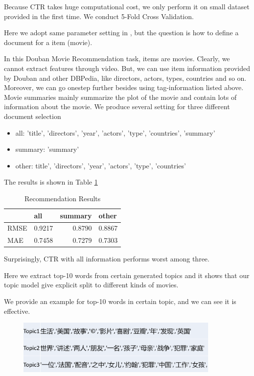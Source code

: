 \documentclass[11pt,a4paper]{article}
\begin{document}
Because CTR takes huge computational cost, we only perform it on small dataset provided in the first time. We conduct 5-Fold Cross Validation.

Here we adopt same parameter setting in \citep{wang2011collaborative}, but the question is how to define a document for a item (movie).

In this Douban Movie Recommendation task, items are movies. Clearly, we cannot extract features through video. But, we can use item information provided by Douban and other DBPedia, like directors, actors, types, countries and so on. Moreover, we can go onestep further besides using tag-information listed above. Movie summaries mainly summarize the plot of the movie and contain lots of information about the movie. We produce several setting for three different document selection

\begin{itemize}
  \item all: 'title', 'directors', 'year', 'actors', 'type', 'countries', 'summary'
  \item summary: 'summary'
  \item other: title', 'directors', 'year', 'actors', 'type', 'countries'
\end{itemize}

The results is shown in Table \ref{tab:1}

\begin{table}[htbp]
  \centering
  \caption{Recommendation Results}
    \begin{tabular}{lrrr}
      \toprule
          & \multicolumn{1}{l}{all} & \multicolumn{1}{l}{summary} & \multicolumn{1}{l}{other} \\
          \midrule
    RMSE  & 0.9217 & 0.8790 & 0.8867 \\
    MAE	&0.7458&	0.7279&	0.7303\\
    \bottomrule
    \end{tabular}%
  \label{tab:1}%
\end{table}%

Surprisingly, CTR with all information performs worst among three.

Here we extract top-10 words from certain generated topics and it shows that our topic model give explicit split to different kinds of movies.

We provide an example for top-10 words in certain topic, and we can see it is effective.

\begin{figure}[ht]
\centering
\includegraphics[width = 10cm]{7.png}
\caption{}
\label{7}
\end{figure}
\end{document}
